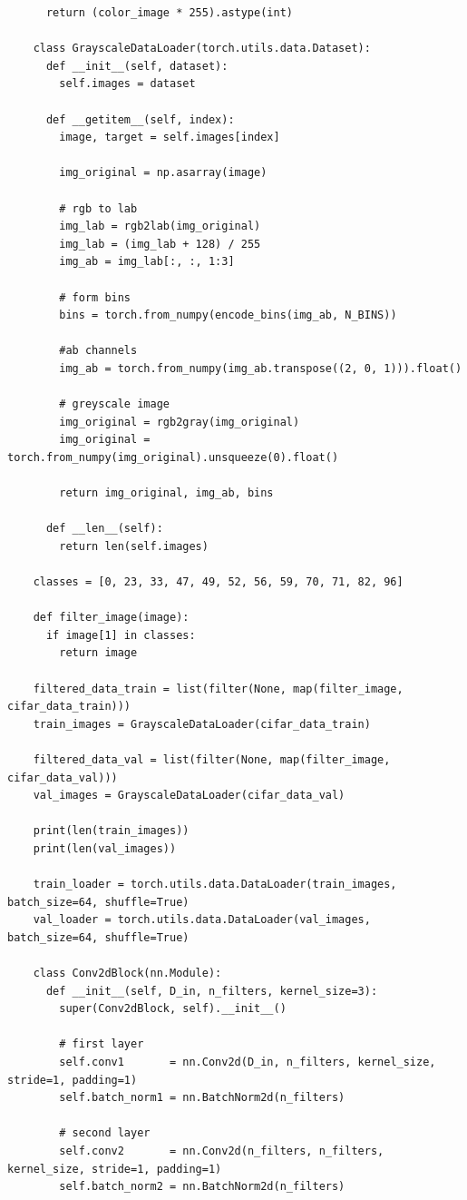 \begin{longlisting}
\begin{verbatim}
      return (color_image * 255).astype(int)

    class GrayscaleDataLoader(torch.utils.data.Dataset):
      def __init__(self, dataset):
        self.images = dataset

      def __getitem__(self, index):
        image, target = self.images[index]
        
        img_original = np.asarray(image)

        # rgb to lab
        img_lab = rgb2lab(img_original)
        img_lab = (img_lab + 128) / 255
        img_ab = img_lab[:, :, 1:3]

        # form bins
        bins = torch.from_numpy(encode_bins(img_ab, N_BINS))

        #ab channels
        img_ab = torch.from_numpy(img_ab.transpose((2, 0, 1))).float()

        # greyscale image
        img_original = rgb2gray(img_original)
        img_original = torch.from_numpy(img_original).unsqueeze(0).float()
        
        return img_original, img_ab, bins

      def __len__(self):
        return len(self.images)

    classes = [0, 23, 33, 47, 49, 52, 56, 59, 70, 71, 82, 96]

    def filter_image(image):
      if image[1] in classes:
        return image

    filtered_data_train = list(filter(None, map(filter_image, cifar_data_train)))
    train_images = GrayscaleDataLoader(cifar_data_train)

    filtered_data_val = list(filter(None, map(filter_image, cifar_data_val)))
    val_images = GrayscaleDataLoader(cifar_data_val)

    print(len(train_images))
    print(len(val_images))

    train_loader = torch.utils.data.DataLoader(train_images, batch_size=64, shuffle=True)
    val_loader = torch.utils.data.DataLoader(val_images, batch_size=64, shuffle=True)

    class Conv2dBlock(nn.Module):
      def __init__(self, D_in, n_filters, kernel_size=3):
        super(Conv2dBlock, self).__init__()

        # first layer
        self.conv1       = nn.Conv2d(D_in, n_filters, kernel_size, stride=1, padding=1)
        self.batch_norm1 = nn.BatchNorm2d(n_filters)

        # second layer
        self.conv2       = nn.Conv2d(n_filters, n_filters, kernel_size, stride=1, padding=1)
        self.batch_norm2 = nn.BatchNorm2d(n_filters)
      

\end{verbatim}
\end{longlisting}
